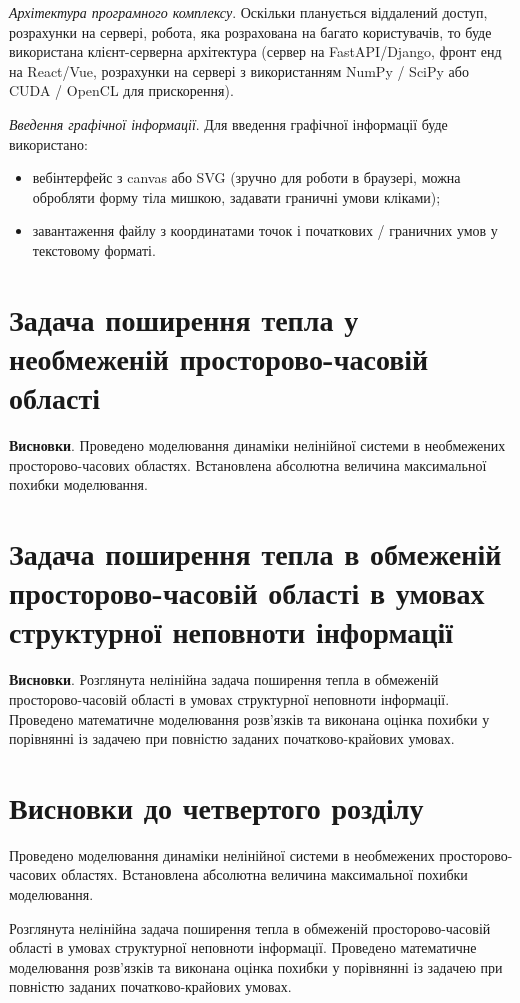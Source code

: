\textit{Архітектура програмного комплексу}. Оскільки планується віддалений доступ, розрахунки на сервері, робота, яка розрахована на багато користувачів,
то буде використана клієнт-серверна архітектура (сервер на FastAPI/Django, фронт енд на React/Vue, розрахунки на сервері з
використанням NumPy / SciPy або CUDA / OpenCL для прискорення).

\textit{Введення графічної інформації}. Для введення графічної інформації буде використано:
\begin{itemize}
    \item вебінтерфейс з canvas або SVG (зручно для роботи в браузері, можна обробляти форму тіла мишкою, задавати граничні умови кліками);
    \item завантаження файлу з координатами точок і початкових / граничних умов у текстовому форматі.
\end{itemize}
\section{Задача поширення тепла у необмеженій просторово-часовій області} \label{sect4_2}

\textbf{Висновки}. Проведено моделювання динаміки нелінійної системи в необмежених просторово-часових областях.
Встановлена абсолютна величина максимальної похибки моделювання.

\section{Задача поширення тепла в обмеженій просторово-часовій області в умовах
структурної неповноти інформації} \label{sect4_3}

\textbf{Висновки}. Розглянута нелінійна задача поширення тепла в обмеженій просторово-часовій області в умовах
структурної неповноти інформації. Проведено математичне моделювання розв’язків та виконана оцінка похибки у
порівнянні із задачею при повністю заданих початково-крайових умовах.

\section*{Висновки до четвертого розділу}

Проведено моделювання динаміки нелінійної системи в необмежених просторово-часових областях. Встановлена абсолютна
величина максимальної похибки моделювання.

Розглянута нелінійна задача поширення тепла в обмеженій просторово-часовій області в умовах структурної
неповноти інформації. Проведено математичне моделювання розв’язків та виконана оцінка похибки у порівнянні із
задачею при повністю заданих початково-крайових умовах.
